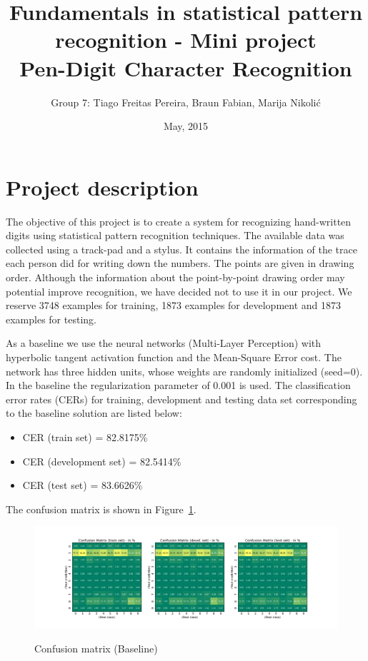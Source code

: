 \documentclass[a4paper,10pt,fleqn]{article}
\title{\large{Fundamentals in statistical pattern recognition - Mini project}\\ \Large{\textbf{Pen-Digit Character Recognition}}}
\author{
Group 7: Tiago Freitas Pereira, Braun Fabian, Marija Nikoli\'c}
\date{ May, 2015}
\begin{document}
\maketitle
\thispagestyle{fancy}

\section{Project description}\label{sec:description}
The objective of this project is to create a system for
recognizing hand-written digits using statistical pattern recognition techniques.
The available data was collected using a track-pad and a stylus. 
It contains the information of the trace each person did for
writing down the numbers. The points are given in drawing order.
Although the information about the point-by-point drawing order may potential improve recognition, we have decided not to use it in our project.
We reserve 3748 examples for training, 1873 examples for development and 1873 examples for testing.

As a baseline we use the neural networks (Multi-Layer Perception) with hyperbolic tangent activation function and the Mean-Square Error cost.
The network has three hidden units, whose weights are  randomly initialized (seed=0).
In the baseline the regularization parameter of 0.001 is used.
The classification error rates (CERs) for training, development and testing data set corresponding to the baseline solution are listed below:
\begin{itemize}
\item CER (train set) = 82.8175\%
\item CER (development set) = 82.5414\%
\item CER (test set) = 83.6626\%
\end{itemize}
The confusion matrix is shown in  Figure~\ref{fig:baseline}.
\begin{figure}[htbf]
  \caption{Confusion matrix (Baseline)}
  \centering \includegraphics[width=\textwidth,height=0.3\textwidth]{Figures/baseline}
  \label{fig:baseline}
\end{figure}
\end{document}
